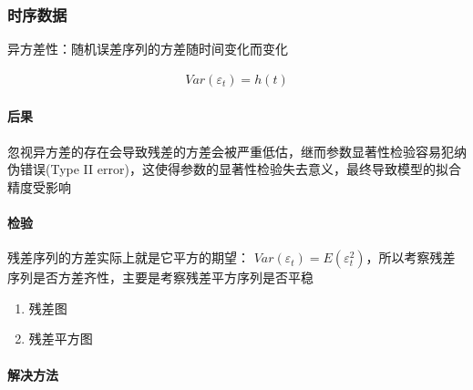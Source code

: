 \documentclass[12pt]{book}
\begin{document}
\subsubsection{时序数据}









异方差性：随机误差序列的方差随时间变化而变化

\begin{gather*}
    Var(\varepsilon_t)=h(t)
\end{gather*}


\paragraph{后果}
忽视异方差的存在会导致残差的方差会被严重低估，继而参数显著性检验容易犯纳伪错误(Type II error)，这使得参数的显著性检验失去意义，最终导致模型的拟合精度受影响

\paragraph{检验}

残差序列的方差实际上就是它平方的期望：
$Var(\varepsilon_t)=E(\varepsilon_t^2)$，所以考察残差序列是否方差齐性，主要是考察残差平方序列是否平稳

\begin{enumerate}[1.]
    \item 残差图
    \item 残差平方图
\end{enumerate}


\paragraph{解决方法}
\end{document}
